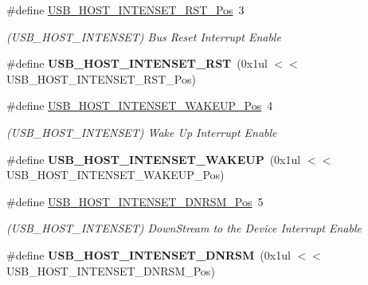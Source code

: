 \begin{DoxyCompactItemize}
\item 
\hypertarget{group___s_a_m_l21___u_s_b_gafbd02b599a5e29d263bd4e1537737921}{}\#define \hyperlink{group___s_a_m_l21___u_s_b_gafbd02b599a5e29d263bd4e1537737921}{U\+S\+B\+\_\+\+H\+O\+S\+T\+\_\+\+I\+N\+T\+E\+N\+S\+E\+T\+\_\+\+R\+S\+T\+\_\+\+Pos}~3\label{group___s_a_m_l21___u_s_b_gafbd02b599a5e29d263bd4e1537737921}

\begin{DoxyCompactList}\small\item\em (U\+S\+B\+\_\+\+H\+O\+S\+T\+\_\+\+I\+N\+T\+E\+N\+S\+E\+T) Bus Reset Interrupt Enable \end{DoxyCompactList}\item 
\hypertarget{group___s_a_m_l21___u_s_b_ga8c8d0da96168414cc363ddc9be0beaae}{}\#define {\bfseries U\+S\+B\+\_\+\+H\+O\+S\+T\+\_\+\+I\+N\+T\+E\+N\+S\+E\+T\+\_\+\+R\+S\+T}~(0x1ul $<$$<$ U\+S\+B\+\_\+\+H\+O\+S\+T\+\_\+\+I\+N\+T\+E\+N\+S\+E\+T\+\_\+\+R\+S\+T\+\_\+\+Pos)\label{group___s_a_m_l21___u_s_b_ga8c8d0da96168414cc363ddc9be0beaae}

\item 
\hypertarget{group___s_a_m_l21___u_s_b_gaf1431001f10f4fd430dbf065eaf17fd8}{}\#define \hyperlink{group___s_a_m_l21___u_s_b_gaf1431001f10f4fd430dbf065eaf17fd8}{U\+S\+B\+\_\+\+H\+O\+S\+T\+\_\+\+I\+N\+T\+E\+N\+S\+E\+T\+\_\+\+W\+A\+K\+E\+U\+P\+\_\+\+Pos}~4\label{group___s_a_m_l21___u_s_b_gaf1431001f10f4fd430dbf065eaf17fd8}

\begin{DoxyCompactList}\small\item\em (U\+S\+B\+\_\+\+H\+O\+S\+T\+\_\+\+I\+N\+T\+E\+N\+S\+E\+T) Wake Up Interrupt Enable \end{DoxyCompactList}\item 
\hypertarget{group___s_a_m_l21___u_s_b_gad94eb555a5292d3cd3cab3fa8c77c2fc}{}\#define {\bfseries U\+S\+B\+\_\+\+H\+O\+S\+T\+\_\+\+I\+N\+T\+E\+N\+S\+E\+T\+\_\+\+W\+A\+K\+E\+U\+P}~(0x1ul $<$$<$ U\+S\+B\+\_\+\+H\+O\+S\+T\+\_\+\+I\+N\+T\+E\+N\+S\+E\+T\+\_\+\+W\+A\+K\+E\+U\+P\+\_\+\+Pos)\label{group___s_a_m_l21___u_s_b_gad94eb555a5292d3cd3cab3fa8c77c2fc}

\item 
\hypertarget{group___s_a_m_l21___u_s_b_gaa3de4dc6e13807025e0156bf72ed2c53}{}\#define \hyperlink{group___s_a_m_l21___u_s_b_gaa3de4dc6e13807025e0156bf72ed2c53}{U\+S\+B\+\_\+\+H\+O\+S\+T\+\_\+\+I\+N\+T\+E\+N\+S\+E\+T\+\_\+\+D\+N\+R\+S\+M\+\_\+\+Pos}~5\label{group___s_a_m_l21___u_s_b_gaa3de4dc6e13807025e0156bf72ed2c53}

\begin{DoxyCompactList}\small\item\em (U\+S\+B\+\_\+\+H\+O\+S\+T\+\_\+\+I\+N\+T\+E\+N\+S\+E\+T) Down\+Stream to the Device Interrupt Enable \end{DoxyCompactList}\item 
\hypertarget{group___s_a_m_l21___u_s_b_gac81e80d7e5680dc989e6b9b1aba7ac11}{}\#define {\bfseries U\+S\+B\+\_\+\+H\+O\+S\+T\+\_\+\+I\+N\+T\+E\+N\+S\+E\+T\+\_\+\+D\+N\+R\+S\+M}~(0x1ul $<$$<$ U\+S\+B\+\_\+\+H\+O\+S\+T\+\_\+\+I\+N\+T\+E\+N\+S\+E\+T\+\_\+\+D\+N\+R\+S\+M\+\_\+\+Pos)\label{group___s_a_m_l21___u_s_b_gac81e80d7e5680dc989e6b9b1aba7ac11}


\end{DoxyCompactItemize}
